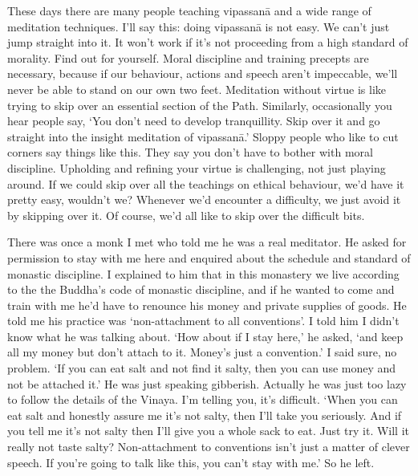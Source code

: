 These days there are many people teaching vipassan\=a and a wide range of meditation techniques. I'll say this: doing vipassan\=a is not easy. We can't just jump straight into it. It won't work if it's not proceeding from a high standard of morality. Find out for yourself. Moral discipline and training precepts are necessary, because if our behaviour, actions and speech aren't impeccable, we'll never be able to stand on our own two feet. Meditation without virtue is like trying to skip over an essential section of the Path. Similarly, occasionally you hear people say, `You don't need to develop tranquillity. Skip over it and go straight into the insight meditation of vipassan\=a.' Sloppy people who like to cut corners say things like this. They say you don't have to bother with moral discipline. Upholding and refining your virtue is challenging, not just playing around. If we could skip over all the teachings on ethical behaviour, we'd have it pretty easy, wouldn't we? Whenever we'd encounter a difficulty, we just avoid it by skipping over it. Of course, we'd all like to skip over the difficult bits.

There was once a monk I met who told me he was a real meditator. He asked for permission to stay with me here and enquired about the schedule and standard of monastic discipline. I explained to him that in this monastery we live according to the  the Buddha's code of monastic discipline, and if he wanted to come and train with me he'd have to renounce his money and private supplies of goods. He told me his practice was `non-attachment to all conventions'. I told him I didn't know what he was talking about. `How about if I stay here,' he asked, `and keep all my money but don't attach to it. Money's just a convention.' I said sure, no problem. `If you can eat salt and not find it salty, then you can use money and not be attached it.' He was just speaking gibberish. Actually he was just too lazy to follow the details of the Vinaya. I'm telling you, it's difficult. `When you can eat salt and honestly assure me it's not salty, then I'll take you seriously. And if you tell me it's not salty then I'll give you a whole sack to eat. Just try it. Will it really not taste salty? Non-attachment to conventions isn't just a matter of clever speech. If you're going to talk like this, you can't stay with me.' So he left.

